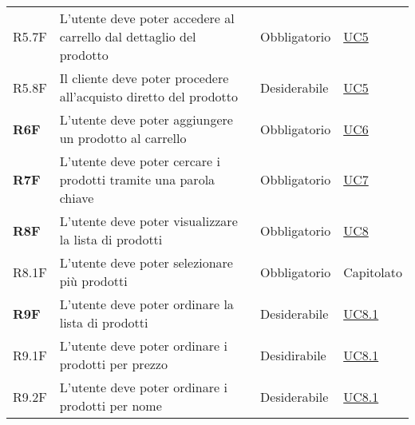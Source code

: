 \begin{center}
\begin{longtable}[!h]{p{50px} p{245px} p{75px} p{50px}}
        R5.7F                                 & L'utente deve poter accedere al carrello dal dettaglio del prodotto                                                                & Obbligatorio             & \hyperref[sec:UC5]{UC5}                      \\
        R5.8F                                 & Il cliente deve poter procedere all'acquisto diretto del prodotto                                                                  & Desiderabile             & \hyperref[sec:UC5]{UC5}                      \\
        \textbf{R6F}                          & L'utente deve poter aggiungere un prodotto al carrello                                                                             & Obbligatorio             & \hyperref[sec:UC6]{UC6}                      \\
        \textbf{R7F}                          & L'utente deve poter cercare i prodotti tramite una parola chiave                                                                   & Obbligatorio             & \hyperref[sec:UC7]{UC7}                      \\
        \textbf{R8F}                          & L'utente deve poter visualizzare la lista di prodotti                                                                              & Obbligatorio             & \hyperref[sec:UC8]{UC8}                      \\
        R8.1F                                 & L'utente deve poter selezionare più prodotti                                                                                       & Obbligatorio             & Capitolato                                   \\
        \textbf{R9F}                          & L'utente deve poter ordinare la lista di prodotti                                                                                  & Desiderabile             & \hyperref[sec:UC8.1]{UC8.1}                  \\
        R9.1F                                 & L'utente deve poter ordinare i prodotti per prezzo                                                                                 & Desidirabile             & \hyperref[sec:UC8.1]{UC8.1}                  \\
        R9.2F                                 & L'utente deve poter ordinare i prodotti per nome                                                                                   & Desiderabile             & \hyperref[sec:UC8.1]{UC8.1}                  \\

\end{longtable}
\end{center}

